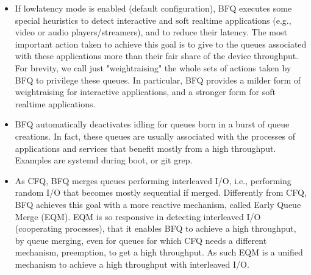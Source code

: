 \documentclass[a4paper,11pt,english]{sphinxmanual}
\begin{document}
\begin{itemize}
\begin{itemize}
\begin{itemize}
\begin{itemize}
\end{itemize}

\end{itemize}
\begin{itemize}
\item {} 
On flash\sphinxhyphen{}based storage with internal queueing of commands
(typically NCQ), device idling happens to be always detrimental
for throughput. So, with these devices, BFQ performs idling
only when strictly needed for service guarantees, i.e., for
guaranteeing low latency or fairness. In these cases, overall
throughput may be sub\sphinxhyphen{}optimal. No solution currently exists to
provide both strong service guarantees and optimal throughput
on devices with internal queueing.

\end{itemize}

\item {} 
If low\sphinxhyphen{}latency mode is enabled (default configuration), BFQ
executes some special heuristics to detect interactive and soft
real\sphinxhyphen{}time applications (e.g., video or audio players/streamers),
and to reduce their latency. The most important action taken to
achieve this goal is to give to the queues associated with these
applications more than their fair share of the device
throughput. For brevity, we call just "weight\sphinxhyphen{}raising" the whole
sets of actions taken by BFQ to privilege these queues. In
particular, BFQ provides a milder form of weight\sphinxhyphen{}raising for
interactive applications, and a stronger form for soft real\sphinxhyphen{}time
applications.

\item {} 
BFQ automatically deactivates idling for queues born in a burst of
queue creations. In fact, these queues are usually associated with
the processes of applications and services that benefit mostly
from a high throughput. Examples are systemd during boot, or git
grep.

\item {} 
As CFQ, BFQ merges queues performing interleaved I/O, i.e.,
performing random I/O that becomes mostly sequential if
merged. Differently from CFQ, BFQ achieves this goal with a more
reactive mechanism, called Early Queue Merge (EQM). EQM is so
responsive in detecting interleaved I/O (cooperating processes),
that it enables BFQ to achieve a high throughput, by queue
merging, even for queues for which CFQ needs a different
mechanism, preemption, to get a high throughput. As such EQM is a
unified mechanism to achieve a high throughput with interleaved
I/O.


\end{itemize}
\end{itemize}
\end{document}
